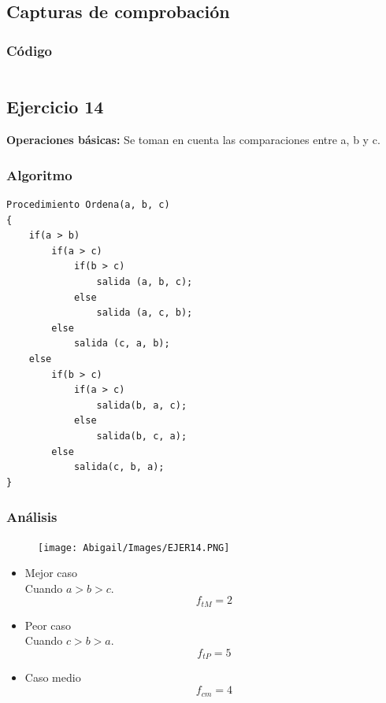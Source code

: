 \documentclass[12pt]{article}
\begin{document}
	        \subsection{Capturas de comprobación}

	        \subsubsection{Código}
	            \begin{lstlisting}[style=Java]
    		    \end{lstlisting}

	    \subsection{Ejercicio 14}
		\textbf{Operaciones básicas:} Se toman en cuenta las comparaciones entre a, b y c.
			\subsubsection{Algoritmo}
			    \begin{lstlisting}[style=Java]
Procedimiento Ordena(a, b, c)
{
	if(a > b)
		if(a > c)
			if(b > c)
				salida (a, b, c);
			else
				salida (a, c, b);		
		else
			salida (c, a, b);
	else
		if(b > c)
			if(a > c)
				salida(b, a, c);
			else
				salida(b, c, a);
		else
			salida(c, b, a);
} 
    		    \end{lstlisting}

	        \subsubsection{Análisis}

		        \begin{figure}[h!]
	                \centering
	                \texttt{[image: Abigail/Images/EJER14.PNG]}
	 		    \end{figure} 
	    		\begin{itemize}
	    			\item[\Checklist] Mejor caso \\
	    			Cuando $ a>b>c $. 
	    			$$
	    				f_{tM} = 2
	    			$$
	    			\item[\Checklist] Peor caso \\
					Cuando $ c>b>a $. 
	    			$$
	    				f_{tP} = 5
	    			$$
	    			
					\item[\Checklist] Caso medio \\
					$$
						f_{cm} = 4
					$$

				\end{itemize}
\end{document}
